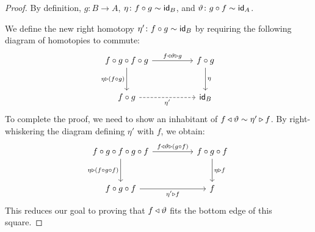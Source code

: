 \begin{proof}
    By definition, $g\colon B\to A$, $\eta\colon f\circ g\sim\id_B$, and $\vartheta\colon g\circ f\sim\id_A$.

    We define the new right homotopy $\eta'\colon f\circ g\sim\id_B$ by requiring the following diagram of homotopies to commute:
    \[
        \begin{tikzcd}[column sep=huge, row sep=large]
            f\circ g\circ f\circ g
                \arrow[r,"f\lwct\vartheta\rwct g"]
                \arrow[d,"\eta\rwct(f\circ g)"'] &
            f\circ g
                \arrow[d,"\eta"] \\
            f\circ g
                \arrow[r,"\eta'"',dashed] &
            \id_B
        \end{tikzcd}
    \]
    To complete the proof, we need to show an inhabitant of $f\triangleleft\vartheta\sim\eta'\triangleright f$. By right-whiskering the diagram defining $\eta'$ with $f$, we obtain:
    \[
        \begin{tikzcd}[column sep=huge, row sep=large]
            f\circ g\circ f\circ g\circ f
                \arrow[r,"f\lwct\vartheta\rwct(g\circ f)"]
                \arrow[d,"\eta\rwct(f\circ g\circ f)"'] &
            f\circ g\circ f
                \arrow[d,"\eta\rwct f"] \\
            f\circ g\circ f
                \arrow[r,"\eta'\rwct f"'] &
            f
        \end{tikzcd}
    \]
    This reduces our goal to proving that $f\triangleleft\vartheta$ fits the bottom edge of this square.


\end{proof}
